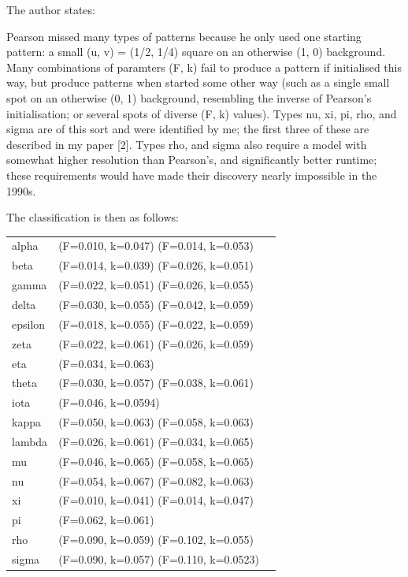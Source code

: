 The author states:
\begin{displayquote}
{\color{darkgray}
Pearson missed many types of patterns because he only used one starting pattern: 
a small (u, v) = (1/2, 1/4) square on an otherwise (1, 0) background. Many combinations of paramters (F, k) fail to produce 
a pattern if initialised this way, but produce patterns when started some other way (such as a single small spot on 
an otherwise (0, 1) background, resembling the inverse of Pearson's initialisation; or several spots of
diverse (F, k) values). Types nu, xi, pi, rho, and sigma are of this sort and were identified by me; 
the first three of these are described in my paper [2]. Types rho, and sigma also require a model with somewhat higher 
resolution than Pearson's, and significantly better runtime; these requirements would have made their discovery 
nearly impossible in the 1990s.
}
\end{displayquote} 



The classification is then as follows:
\begin{center}
\begin{tabular}{lll}
alpha   & (F=0.010, k=0.047) (F=0.014, k=0.053) \\
beta    & (F=0.014, k=0.039) (F=0.026, k=0.051) \\
gamma   & (F=0.022, k=0.051) (F=0.026, k=0.055) \\
delta   & (F=0.030, k=0.055) (F=0.042, k=0.059) \\
epsilon & (F=0.018, k=0.055) (F=0.022, k=0.059) \\
zeta    & (F=0.022, k=0.061) (F=0.026, k=0.059) \\
eta     & (F=0.034, k=0.063) 	\\
theta   & (F=0.030, k=0.057) (F=0.038, k=0.061) \\
iota    & (F=0.046, k=0.0594)   \\
kappa   & (F=0.050, k=0.063) (F=0.058, k=0.063) \\
lambda  & (F=0.026, k=0.061) (F=0.034, k=0.065) \\
mu      & (F=0.046, k=0.065) (F=0.058, k=0.065) \\
nu      & (F=0.054, k=0.067) (F=0.082, k=0.063) \\
xi      & (F=0.010, k=0.041) (F=0.014, k=0.047) \\
pi      & (F=0.062, k=0.061) \\
rho     & (F=0.090, k=0.059) (F=0.102, k=0.055) \\
sigma   & (F=0.090, k=0.057) (F=0.110, k=0.0523)
\end{tabular}
\end{center}






